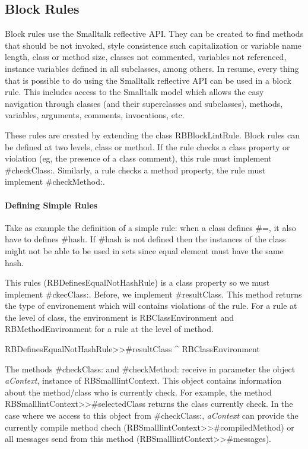 \documentclass[a4paper,10pt,twoside]{book}
\begin{document}
\subsection{Block Rules}

Block rules use the Smalltalk reflective API. They can be created to find methods that should be not invoked, style consistence such capitalization or variable name length, class or method size, classes not commented, variables not referenced, instance variables defined in all subclasses, among others. In resume, every thing that is possible to do using the Smalltalk reflective API can be used in a block rule. This includes access to the Smalltalk model which allows the easy navigation through classes (and their superclasses and subclasses), methods, variables, arguments, comments, invocations, etc.

These rules are created by extending the class RBBlockLintRule.
 Block rules can be defined at two levels, class or method. If the rule checks a class property or violation (eg, the presence of a class comment), this rule must implement #checkClass:. Similarly, a rule checks  a method property, the rule must implement #checkMethod:.

\paragraph{Defining Simple Rules}
Take as example the definition of a simple rule:  when a class defines #=, it also have to defines  #hash. If #hash is not defined then the instances of the class might not be able to be used in sets since equal element must have the same hash.

This rules (RBDefinesEqualNotHashRule) is a class property so we must implement #ckecClass:. Before, we implement #resultClass. This method returns the type of environement which will contains violations of the rule. For a rule at the level of class, the environment is RBClassEnvironment and RBMethodEnvironment for  a rule at the level of method.

\begin{code}{}
RBDefinesEqualNotHashRule>>#resultClass
	^ RBClassEnvironment
\end{code}

The methods #checkClass: and #checkMethod: receive in parameter the object \emph{aContext},  instance of RBSmalllintContext. This object contains information about the method/class who is currently check. For example, the method RBSmalllintContext>>#selectedClass returns the class currently check. In the case where we access to this object from #checkClass:, \emph{aContext} can provide the currently compile method chech (RBSmalllintContext>>#compiledMethod) or all messages send from this method (RBSmalllintContext>>#messages).
\end{document}
